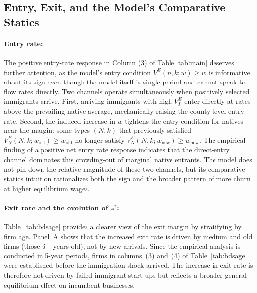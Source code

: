 \subsection{Entry, Exit, and the Model's Comparative Statics}

    \paragraph{Entry rate:} The positive entry-rate response in
    Column (3) of Table \ref{tab:main} deserves further attention, as the model's entry condition $V^{E}(n,k;w)\geq w$ is informative about its sign even though the model itself is single-period and cannot speak to flow rates directly. Two channels operate simultaneously when positively selected immigrants arrive. First, arriving immigrants with high $V^{E}_{I}$ enter directly at rates above the prevailing native average, mechanically raising the county-level entry rate. Second, the induced increase in $w$ tightens the entry condition for natives near the margin: some types $(N,k)$ that previously satisfied $V^{E}_{N}(N,k;w_{\text{old}}) \geq w_{\text{old}}$ no longer satisfy $V^{E}_{N} (N,k;w_{\text{new}}) \geq w_{\text{new}}$. The empirical finding of a positive net entry rate response indicates that the direct-entry channel dominates this crowding-out of marginal native entrants. The model does not pin down the relative magnitude of these two channels, but its comparative-statics intuition rationalizes both the sign and the broader pattern of more churn at higher equilibrium wages.

    \paragraph{Exit rate and the evolution of $z^{*}$:} Table~\ref{tab:bdsage} provides a clearer view of the exit margin by stratifying by firm age. Panel~A shows that the increased exit rate is driven by medium and old firms (those 6+ years old), not by new arrivals. Since the empirical analysis is conducted in 5-year periods, firms in columns~(3) and~(4) of Table~\ref{tab:bdsage} were established before the immigration shock arrived. The increase in exit rate is therefore not driven by failed immigrant start-ups but reflects a broader general-equilibrium effect on incumbent businesses.

